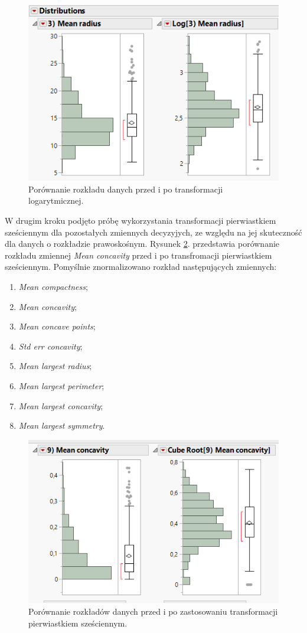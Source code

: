 	\begin{figure}[!ht]
		\centering
		\includegraphics[width=0.7\linewidth]{Rysunki/Rozdzial3/log}
		\caption{Porównanie rozkładu danych przed i po transformacji logarytmicznej.}
		\label{fig:log}
	\end{figure}
	
	\newpage

	W drugim kroku podjęto próbę wykorzystania transformacji pierwiastkiem sześciennym dla pozostałych zmiennych decyzyjych, ze względu na jej skuteczność dla danych o rozkładzie prawoskośnym. Rysunek \ref{fig:cuberoot}. przedstawia porównanie rozkładu zmiennej \textit{Mean concavity} przed i po transfromacji pierwiastkiem sześciennym. Pomyślnie znormalizowano rozkład następujących zmiennych:
	
	\begin{enumerate}
		\item \textit{Mean compactness};
		\item \textit{Mean concavity};
		\item \textit{Mean concave points};
		\item \textit{Std err concavity};
		\item \textit{Mean largest radius};
		\item \textit{Mean largest perimeter};
		\item \textit{Mean largest concavity};
		\item \textit{Mean largest symmetry}.
	\end{enumerate} 

\begin{figure}[!ht]
	\centering
	\includegraphics[width=0.7\linewidth]{Rysunki/Rozdzial3/cube_root}
	\caption{Porównanie rozkładów danych przed i po zastosowaniu transformacji pierwiastkiem sześciennym.}
	\label{fig:cuberoot}
\end{figure}


